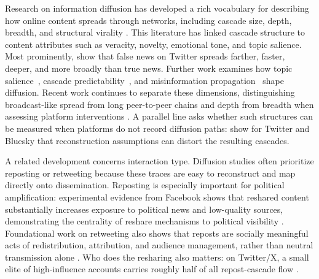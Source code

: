 \documentclass[letterpaper]{article} %
\newcommand{\rev}[1]{{\color{blue}#1}}
\begin{document}
Research on information diffusion has developed a rich vocabulary for describing how online content spreads through networks, including cascade size, depth, breadth, and structural virality \cite{gruhl_information_2004, guille_information_2013, easley_networks_2010, goel_structural_2016}. This literature has linked cascade structure to content attributes such as veracity, novelty, emotional tone, and topic salience. Most prominently, \citet{vosoughi_spread_2018} show that false news on Twitter spreads farther, faster, deeper, and more broadly than true news. Further work examines how topic salience~\cite{wang_factors_2022}, cascade predictability~\cite{cheng_can_2014}, and misinformation propagation~\cite{zhao_fake_2020} shape diffusion. \rev{Recent work continues to separate these dimensions, distinguishing broadcast-like spread from long peer-to-peer chains \citep{gonzalezbailon_diffusion_2024} and depth from breadth when assessing platform interventions \citep{slaughter_community_2025}. A parallel line asks whether such structures can be measured when platforms do not record diffusion paths: \citet{deverna_cascade_2024} show for Twitter and Bluesky that reconstruction assumptions can distort the resulting cascades.}

A related development concerns interaction type. Diffusion studies often prioritize reposting or retweeting because these traces are easy to reconstruct and map directly onto dissemination. Reposting is especially important for political amplification: experimental evidence from Facebook shows that reshared content substantially increases exposure to political news and low-quality sources, demonstrating the centrality of reshare mechanisms to political visibility \cite{guess_reshare_2023}. Foundational work on retweeting also shows that reposts are socially meaningful acts of redistribution, attribution, and audience management, rather than neutral transmission alone \cite{boyd_tweet_2010, park_expanding_2019}. \rev{Who does the resharing also matters: on Twitter/X, a small elite of high-influence accounts carries roughly half of all repost-cascade flow \citep{niitsuma_prestige_2025}.} 
\end{document}

